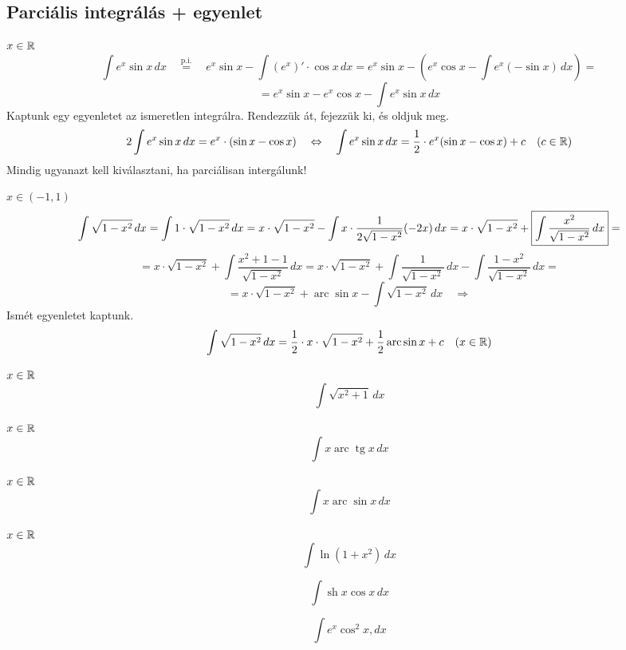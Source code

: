 \documentclass[a4paper,11.5pt]{article}
\DeclareMathOperator{\tg}{tg}
\DeclareMathOperator{\sh}{sh}
\DeclareMathOperator{\arc}{arc}
\begin{document}
	\subsection{Parciális integrálás + egyenlet}
	\begin{task}$x\in\mathbb{R}$
		\[ \int e^x\sin x\,dx\quad \overset{\text{p.i.}}{=}\quad e^x\sin x-\int (e^x)'\cdot\cos x\,dx=e^x\sin x-\left(e^x\cos x-\int e^x(-\sin x)\,dx\right)=\]
		\[=e^x\sin x-e^x\cos x-\int e^x\sin x\,dx \]
		Kaptunk egy egyenletet az ismeretlen integrálra. Rendezzük át, fejezzük ki, és oldjuk meg.
		\[ 2\int e^x\sin x\,dx=e^x\cdot(\sin x-\cos x)\quad \Leftrightarrow\quad \int e^x\sin x\,dx=\frac{1}{2}\cdot e^x(\sin x-\cos x)+c\quad (c\in\mathbb{R}) \]
		Mindig ugyanazt kell kiválasztani, ha parciálisan intergálunk!
	\end{task}
	\begin{task}$x\in(-1,1)$
		\[ \int\sqrt{1-x^2}\,dx=\int1\cdot\sqrt{1-x^2}\,dx=x\cdot\sqrt{1-x^2}-\int x\cdot\frac{1}{2\sqrt{1-x^2}}(-2x)\,dx=x\cdot\sqrt{1-x^2}+\text{\fbox{$\displaystyle \int\frac{x^2}{\sqrt{1-x^2}}\,dx$}}= \]
		\[=x\cdot\sqrt{1-x^2}+\int\frac{x^2+1-1}{\sqrt{1-x^2}}\,dx=x\cdot\sqrt{1-x^2}+\int\frac{1}{\sqrt{1-x^2}}\,dx-\int\frac{1-x^2}{\sqrt{1-x^2}}\,dx=\]
		\[=x\cdot\sqrt{1-x^2}+\arc\sin x-\int\sqrt{1-x^2}\,dx\quad \Rightarrow \]
		Ismét egyenletet kaptunk.
		\[ \int\sqrt{1-x^2}\,dx=\frac{1}{2} \cdot x\cdot\sqrt{1-x^2}+\frac{1}{2}\arc\sin x+c\quad (x\in\R) \]
	\end{task}
	\begin{exercise}$x\in\mathbb{R}$
		\[ \int\sqrt{x^2+1}\,dx \]
	\end{exercise}
	\begin{exercise}$x\in\mathbb{R}$
		\[ \int x\arc\tg x\,dx \]
	\end{exercise}
	\begin{exercise}
		$x\in\mathbb{R}$
		\[ \int x\arc\sin x\,dx \]
	\end{exercise}
	\begin{exercise}
		$x\in\mathbb{R}$
		\[ \int\ln(1+x^2)\,dx \]
	\end{exercise}
	\begin{exercise}
		\[ \int \sh x\cos x\,dx \]
	\end{exercise}
	\begin{exercise}
		\[ \int e^x\cos^2x,dx \]
	\end{exercise}
\end{document}

